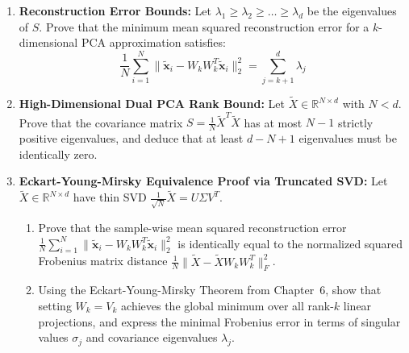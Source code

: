 \begin{enumerate}[label=\textbf{P\arabic*.}]
    \item \textbf{Reconstruction Error Bounds:}
    Let $\lambda_1 \ge \lambda_2 \ge \dots \ge \lambda_d$ be the eigenvalues of $S$.
    Prove that the minimum mean squared reconstruction error for a $k$-dimensional PCA approximation satisfies:
    \begin{equation}
    \frac{1}{N} \sum_{i=1}^N \|\tilde{\mathbf{x}}_i - W_k W_k^T \tilde{\mathbf{x}}_i\|_2^2 = \sum_{j=k+1}^d \lambda_j
    \end{equation}

    \item \textbf{High-Dimensional Dual PCA Rank Bound:}
    Let $\tilde{X} \in \mathbb{R}^{N \times d}$ with $N < d$. Prove that the covariance matrix $S = \frac{1}{N}\tilde{X}^T \tilde{X}$ has at most $N - 1$ strictly positive eigenvalues, and deduce that at least $d - N + 1$ eigenvalues must be identically zero.

    \item \textbf{Eckart-Young-Mirsky Equivalence Proof via Truncated SVD:}
    Let $\tilde{X} \in \mathbb{R}^{N \times d}$ have thin SVD $\frac{1}{\sqrt{N}}\tilde{X} = U \Sigma V^T$.
    \begin{enumerate}[label=(\alph*)]
        \item Prove that the sample-wise mean squared reconstruction error $\frac{1}{N}\sum_{i=1}^N \|\tilde{\mathbf{x}}_i - W_k W_k^T \tilde{\mathbf{x}}_i\|_2^2$ is identically equal to the normalized squared Frobenius matrix distance $\frac{1}{N}\|\tilde{X} - \tilde{X}W_k W_k^T\|_F^2$.
        \item Using the Eckart-Young-Mirsky Theorem from Chapter~6, show that setting $W_k = V_k$ achieves the global minimum over all rank-$k$ linear projections, and express the minimal Frobenius error in terms of singular values $\sigma_j$ and covariance eigenvalues $\lambda_j$.
    \end{enumerate}


\end{enumerate}
